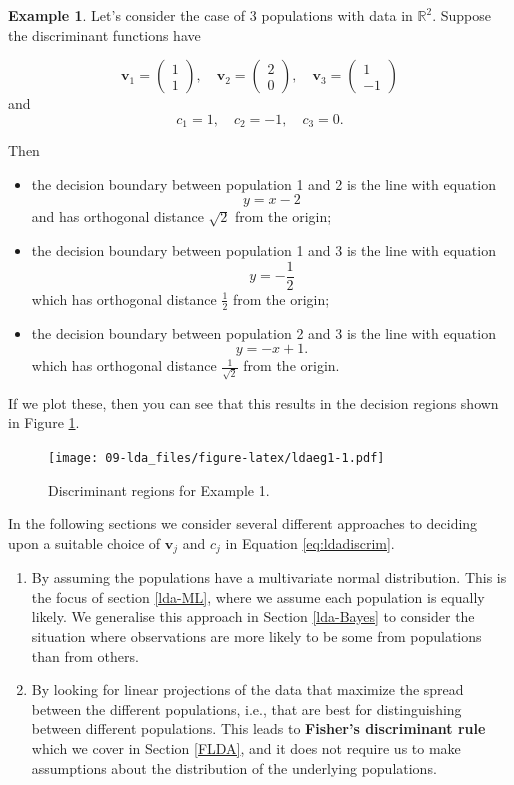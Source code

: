 \documentclass[
]{book}
\theoremstyle{definition}
\theoremstyle{definition}
\newtheorem{example}{Example}[chapter]
\theoremstyle{definition}
\theoremstyle{definition}
\theoremstyle{remark}
\begin{document}
\begin{example}
\protect\hypertarget{exm:ldaex1}{}{\label{exm:ldaex1} }
Let's consider the case of 3 populations with data in \(\mathbb{R}^2\). Suppose the discriminant functions have

\[\mathbf v_1 = \begin{pmatrix}1\\1\end{pmatrix}, \quad \mathbf v_2 = \begin{pmatrix}2\\0\end{pmatrix}, \quad\mathbf v_3 = \begin{pmatrix}1\\-1\end{pmatrix}\]
and
\[c_1=1, \quad c_2=-1, \quad c_3=0.\]

Then

\begin{itemize}
\item
  the decision boundary between population 1 and 2 is the line with equation
  \[y=x-2\]
  and has orthogonal distance \(\sqrt{2}\) from the origin;
\item
  the decision boundary between population 1 and 3 is the line with equation
  \[y=-\frac{1}{2}\]
  which has orthogonal distance \(\frac{1}{2}\) from the origin;
\item
  the decision boundary between population 2 and 3 is the line with equation
  \[y=-x+1.\]
  which has orthogonal distance \(\frac{1}{\sqrt{2}}\) from the origin.
\end{itemize}

If we plot these, then you can see that this results in the decision regions shown in Figure \ref{fig:ldaeg1}.
\end{example}

\begin{figure}
\centering
\texttt{[image: 09-lda\_files/figure-latex/ldaeg1-1.pdf]}
\caption{\label{fig:ldaeg1}Discriminant regions for Example 1.}
\end{figure}

In the following sections we consider several different approaches to deciding upon a suitable choice of \(\mathbf v_j\) and \(c_j\) in Equation \eqref{eq:ldadiscrim}.

\begin{enumerate}
\def\labelenumi{\arabic{enumi}.}
\item
  By assuming the populations have a multivariate normal distribution. This is the focus of section \ref{lda-ML}, where we assume each population is equally likely. We generalise this approach in Section \ref{lda-Bayes} to consider the situation where observations are more likely to be some from populations than from others.
\item
  By looking for linear projections of the data that maximize the spread between the different populations, i.e., that are best for distinguishing between different populations. This leads to \textbf{Fisher's discriminant rule} which we cover in Section \ref{FLDA}, and it does not require us to make assumptions about the distribution of the underlying populations.
\end{enumerate}
\end{document}
